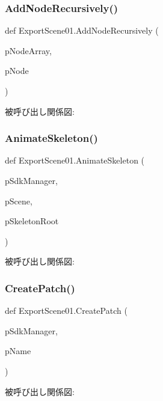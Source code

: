 \subsubsection{\texorpdfstring{Add\+Node\+Recursively()}{AddNodeRecursively()}}
{\footnotesize\ttfamily def Export\+Scene01.\+Add\+Node\+Recursively (\begin{DoxyParamCaption}\item[{}]{p\+Node\+Array,  }\item[{}]{p\+Node }\end{DoxyParamCaption})}

被呼び出し関係図\+:
\mbox{\label{namespace_export_scene01_a9096c489c0a4ce8c2755775b58800ea8}} 
\subsubsection{\texorpdfstring{Animate\+Skeleton()}{AnimateSkeleton()}}
{\footnotesize\ttfamily def Export\+Scene01.\+Animate\+Skeleton (\begin{DoxyParamCaption}\item[{}]{p\+Sdk\+Manager,  }\item[{}]{p\+Scene,  }\item[{}]{p\+Skeleton\+Root }\end{DoxyParamCaption})}

被呼び出し関係図\+:
\mbox{\label{namespace_export_scene01_a7465dc2df82a70a14fe71b8287dedfa5}} 
\subsubsection{\texorpdfstring{Create\+Patch()}{CreatePatch()}}
{\footnotesize\ttfamily def Export\+Scene01.\+Create\+Patch (\begin{DoxyParamCaption}\item[{}]{p\+Sdk\+Manager,  }\item[{}]{p\+Name }\end{DoxyParamCaption})}

被呼び出し関係図\+:
\mbox{\label{namespace_export_scene01_a405c93947107b07b27cb80d3c4712ef1}} 
